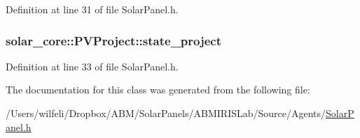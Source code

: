 Definition at line 31 of file Solar\+Panel.\+h.

\hypertarget{classsolar__core_1_1_p_v_project_ab25a22c1202f2314a55dc9a759922183}{}
\subsubsection[{state\+\_\+project}]{ solar\+\_\+core\+::\+P\+V\+Project\+::state\+\_\+project}\label{classsolar__core_1_1_p_v_project_ab25a22c1202f2314a55dc9a759922183}


Definition at line 33 of file Solar\+Panel.\+h.



The documentation for this class was generated from the following file\+:\begin{DoxyCompactItemize}
\item 
/\+Users/wilfeli/\+Dropbox/\+A\+B\+M/\+Solar\+Panels/\+A\+B\+M\+I\+R\+I\+S\+Lab/\+Source/\+Agents/\hyperlink{_solar_panel_8h}{Solar\+Panel.\+h}\end{DoxyCompactItemize}
